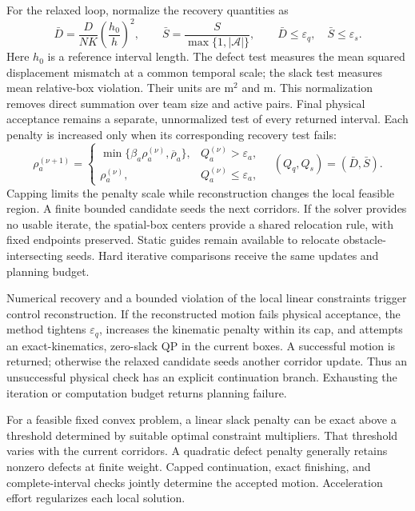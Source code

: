 For the relaxed loop, normalize the recovery quantities as
\begin{equation}
 \bar D=\frac{D}{NK}\left(\frac{h_0}{h}\right)^2,\qquad
 \bar S=\frac{S}{\max\{1,|\mathcal A|\}},\qquad
 \bar D\leq\varepsilon_q,\quad\bar S\leq\varepsilon_s.
 \label{eq:tolerances}
\end{equation}
Here $h_0$ is a reference interval length. The defect test measures the mean squared displacement mismatch at a common temporal scale; the slack test measures mean relative-box violation. Their units are $\mathrm{m}^2$ and $\mathrm{m}$. This normalization removes direct summation over team size and active pairs. Final physical acceptance remains a separate, unnormalized test of every returned interval.
Each penalty is increased only when its corresponding recovery test fails:
\begin{equation}
 \rho_a^{(\nu+1)}=
 \begin{cases}
 \min\{\beta_a\rho_a^{(\nu)},\overline\rho_a\},&Q_a^{(\nu)}>\varepsilon_a,\\
 \rho_a^{(\nu)},&Q_a^{(\nu)}\leq\varepsilon_a,
 \end{cases}
 \quad (Q_q,Q_s)=(\bar D,\bar S).
 \label{eq:weights}
\end{equation}
Capping limits the penalty scale while reconstruction changes the local feasible region. A finite bounded candidate seeds the next corridors. If the solver provides no usable iterate, the spatial-box centers provide a shared relocation rule, with fixed endpoints preserved. Static guides remain available to relocate obstacle-intersecting seeds. Hard iterative comparisons receive the same updates and planning budget.

Numerical recovery and a bounded violation of the local linear constraints trigger control reconstruction. If the reconstructed motion fails physical acceptance, the method tightens $\varepsilon_q$, increases the kinematic penalty within its cap, and attempts an exact-kinematics, zero-slack QP in the current boxes. A successful motion is returned; otherwise the relaxed candidate seeds another corridor update. Thus an unsuccessful physical check has an explicit continuation branch. Exhausting the iteration or computation budget returns planning failure.

For a feasible fixed convex problem, a linear slack penalty can be exact above a threshold determined by suitable optimal constraint multipliers. That threshold varies with the current corridors. A quadratic defect penalty generally retains nonzero defects at finite weight. Capped continuation, exact finishing, and complete-interval checks jointly determine the accepted motion. Acceleration effort regularizes each local solution.

